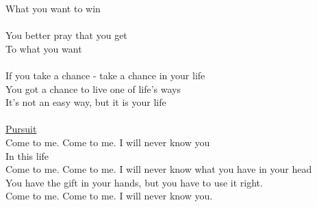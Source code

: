 \documentclass[11pt]{article}
\begin{document}
What you want to win\\
\\
You better pray that you get\\
To what you want\\
\\
If you take a chance - take a chance in your life\\
You got a chance to live one of life's ways\\
It's not an easy way, but it is your life\\
\\
\underline{Pursuit}\\
Come to me. Come to me. I will never know you\\
In this life\\
Come to me. Come to me. I will never know what you have in your head\\
You have the gift in your hands, but you have to use it right.\\
Come to me. Come to me. I will never know you.\\








\end{document}
